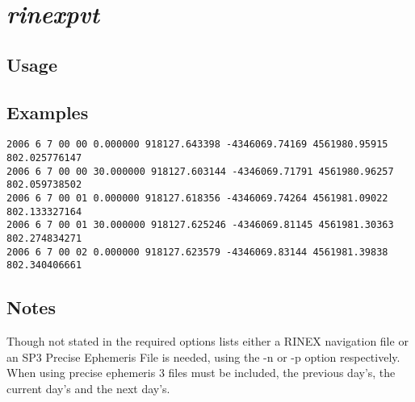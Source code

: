%
%

\section{\emph{rinexpvt}}
\subsection{Usage}

\subsection{Examples}
\begin{\outputsize}
\begin{Verbatim}
2006 6 7 00 00 0.000000 918127.643398 -4346069.74169 4561980.95915 802.025776147
2006 6 7 00 00 30.000000 918127.603144 -4346069.71791 4561980.96257 802.059738502
2006 6 7 00 01 0.000000 918127.618356 -4346069.74264 4561981.09022 802.133327164
2006 6 7 00 01 30.000000 918127.625246 -4346069.81145 4561981.30363 802.274834271
2006 6 7 00 02 0.000000 918127.623579 -4346069.83144 4561981.39838 802.340406661
\end{Verbatim}
\end{\outputsize}


\subsection{Notes}
Though not stated in the required options lists either a RINEX navigation file or an SP3 Precise Ephemeris File is needed, using the -n or -p option respectively. When using precise ephemeris 3 files must be included, the previous day's, the current day's and the next day's. 

%

